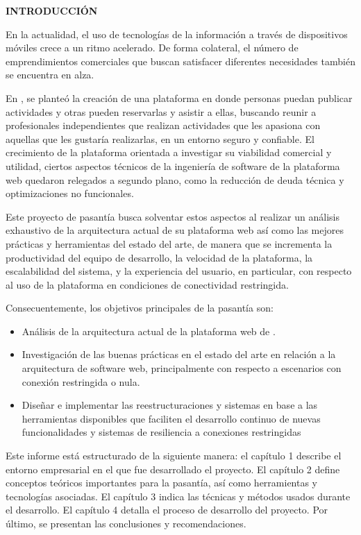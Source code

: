 
\begin{center}
\textsc{\bfseries\uppercase{Introducción}}
\end{center}

En la actualidad, el uso de tecnologías de la información a través de dispositivos móviles crece a un ritmo acelerado. De forma colateral, el número de emprendimientos comerciales que buscan satisfacer diferentes necesidades también se encuentra en alza.

En \business, se planteó la creación de una plataforma en donde personas puedan publicar actividades y otras pueden reservarlas y asistir a ellas, buscando reunir a profesionales independientes que realizan actividades que les apasiona con aquellas que les gustaría realizarlas, en un entorno seguro y confiable. El crecimiento de la plataforma orientada a investigar su viabilidad comercial y utilidad, ciertos aspectos técnicos de la ingeniería de software de la plataforma web quedaron relegados a segundo plano, como la reducción de deuda técnica y optimizaciones no funcionales.

Este proyecto de pasantía busca solventar estos aspectos al realizar un análisis exhaustivo de la arquitectura actual de su plataforma web así como las mejores prácticas y herramientas del estado del arte, de manera que se incrementa la productividad del equipo de desarrollo, la velocidad de la plataforma, la escalabilidad del sistema, y la experiencia del usuario, en particular, con respecto al uso de la plataforma en condiciones de conectividad restringida.

Consecuentemente, los objetivos principales de la pasantía son:

\begin{itemize}
  \item Análisis de la arquitectura actual de la plataforma web de \business.
  \item Investigación de las buenas prácticas en el estado del arte en relación a la arquitectura de software web, principalmente con respecto a escenarios con conexión restringida o nula.
  \item Diseñar e implementar las reestructuraciones y sistemas en base a las herramientas disponibles que faciliten el desarrollo continuo de nuevas funcionalidades y sistemas de resiliencia a conexiones restringidas
\end{itemize}

Este informe está estructurado de la siguiente manera: el capítulo 1 describe el entorno empresarial en el que fue desarrollado el proyecto. El capítulo 2 define conceptos teóricos importantes para la pasantía, así como herramientas y tecnologías asociadas. El capítulo 3 indica las técnicas y métodos usados durante el desarrollo. El capítulo 4 detalla el proceso de desarrollo del proyecto. Por último, se presentan las conclusiones y recomendaciones.
